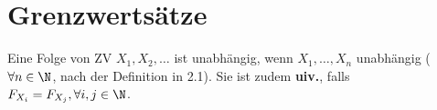 \section{Grenzwertsätze}
Eine Folge von ZV $X_1, X_2, \ldots$ ist unabhängig, wenn $X_1, \ldots, X_n$ unabhängig ($\forall n \in \N$, nach der Definition in 2.1).
Sie ist zudem \textbf{uiv.}, falls $F_{X_i} = F_{X_j}, \forall i,j \in \N$.